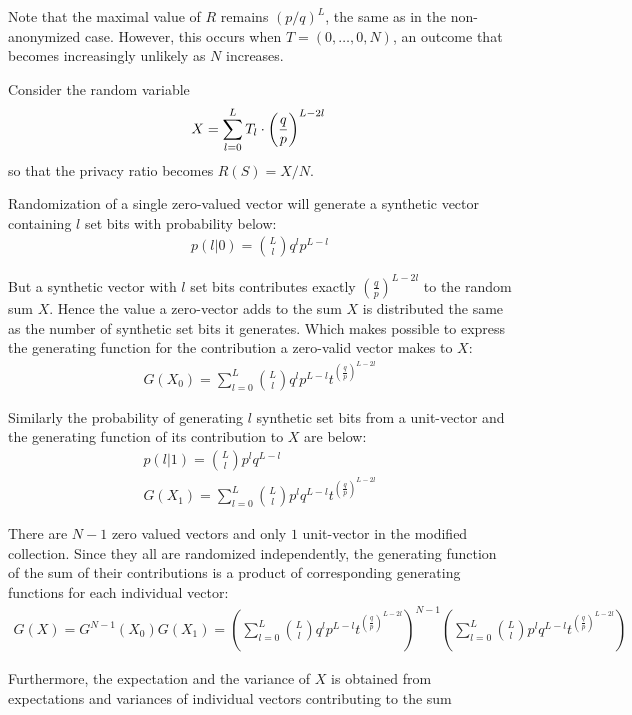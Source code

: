 \documentclass[11pt]{article}
\begin{document}
Note that the maximal value of $R$ remains $(p/q)^L$, the same as in the non-anonymized case. However, this occurs when $T = (0,\dots,0,N)$, an outcome that becomes increasingly unlikely as $N$ increases.

Consider the random variable
\[
X = \sum_{l=0}^{L} T_l \cdot  \left ( \frac{q}{p} \right )^ {L - 2l} \\
\]
so that the privacy ratio becomes $R(S) = X/N$.

Randomization of a single zero-valued vector will generate a synthetic vector containing  $l$ set bits with probability below:
\begin{align}
 p(l|0) = \binom{L}{l} q^lp^{L-l}
\end{align}

But a synthetic vector with $l$ set bits contributes exactly $ \left ( \frac{q}{p} \right )^ {L - 2l}$ to the random sum $X$.  Hence the value a zero-vector adds to the sum $X$ is distributed the same as the number of synthetic set bits it generates.  Which makes possible to express the generating function for the contribution a zero-valid vector makes to $X$:
\begin{align}
 G(X_0) =   \sum_{l=0}^{L} \binom{L}{l} q^lp^{L-l}t^{ \left ( \frac{q}{p} \right )^ {L - 2l} }
\end{align}

Similarly the probability of generating $l$ synthetic set bits from a unit-vector  and the generating function of its contribution to $X$ are below:
\begin{align}
p(l|1) = \binom{L}{l} p^lq^{L-l} \\
 G(X_1) =   \sum_{l=0}^{L} \binom{L}{l} p^lq^{L-l}t^{ \left ( \frac{q}{p} \right )^ {L - 2l} }
\end{align}

There are $N-1$ zero valued vectors and only $1$ unit-vector in the modified collection.  Since they all are randomized independently, the generating function of the sum of their contributions is a product of corresponding generating functions for each individual vector:
\begin{align}
 G(X) = G^{N-1}(X_0)G(X_1) = \left (  \sum_{l=0}^{L} \binom{L}{l} q^lp^{L-l}t^{ \left ( \frac{q}{p} \right )^ {L - 2l} }  \right )^{N-1} \left (\sum_{l=0}^{L} \binom{L}{l} p^lq^{L-l}t^{ \left ( \frac{q}{p} \right )^ {L - 2l} } \right )
\end{align}

Furthermore, the expectation and the variance of $X$ is obtained from expectations and variances of individual vectors contributing to the sum
 
\end{document}
